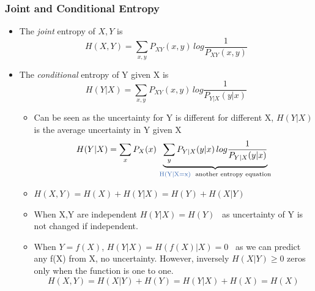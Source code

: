 \documentclass[24pt]{article}
\begin{document}
\subsubsection{Joint and Conditional Entropy}
\begin{itemize}
\item The \textit{joint} entropy of $X,Y$ is 
$$ H(X,Y) = \sum_{x,y}P_{XY}(x,y)\,log\frac{1}{P_{XY}(x,y)}$$

\item The \textit{conditional} entropy of Y given X is 
$$ H(Y|X) = \sum_{x,y}P_{XY}(x,y)\,log\frac{1}{P_{Y|X}(y|x)}$$
\begin{itemize}
\item Can be seen as the uncertainty for Y is different for different X, $H(Y|X)$ is the average uncertainty in Y given X
$$ H(Y|X) = \sum_{x}P_{X}(x)\,\underbrace{\sum_{y}P_{Y|X}(y|x)\,log\frac{1}{P_{Y|X}(y|x)}}_\text{\textcolor{blue1}{H(Y|X=x)}  \textrm{ another entropy equation}}$$
\item $H(X,Y) = H(X) + H(Y|X) = H(Y) + H(X|Y)$

\item When X,Y are independent $H(Y|X) = H(Y)$ \ as uncertainty of Y is not changed if  independent.

\item When $Y = f(X)$,  $H(Y|X) = H(f(X)|X) = 0$ \ as we can predict any f(X) from X, no uncertainty. However, inversely $H(X|Y) \ge 0$ zeros only when the function is one to one.
$$H(X,Y) = H(X|Y) + H(Y) = H(Y|X) + H(X) = H(X)$$
\end{itemize}
\end{itemize}
\end{document}

